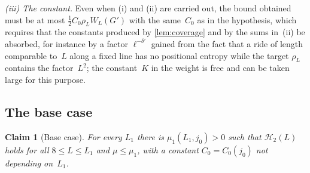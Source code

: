 \documentclass[11pt,letterpaper]{article}
\newtheorem{claim}{Claim}
\newenvironment{boxedclaim}[2]{\renewcommand{\theclaim}{#1}\begin{framed}\begin{claim}[#2]}{\end{claim}\end{framed}}
\begin{document}
\emph{(iii) The constant.} Even when (i) and (ii) are carried out, the bound obtained must be at most $\tfrac12C_0\rho_LW_L(G')$ with the same~$C_0$ as in the hypothesis, which requires that the constants produced by \cref{lem:coverage} and by the sums in~(ii) be absorbed, for instance by a factor $\ell^{-\delta'}$ gained from the fact that a ride of length comparable to~$L$ along a fixed line has no positional entropy while the target $\rho_L$ contains the factor~$L^2$; the constant~$K$ in the weight is free and can be taken large for this purpose.

\subsection{The base case}

\begin{boxedclaim}{C3}{Base case}
\label{claim:C3}
For every $L_1$ there is $\mu_1(L_1,j_0)>0$ such that $\mathcal H_2(L)$ holds for all $8\le L\le L_1$ and $\mu\le\mu_1$, with a constant $C_0=C_0(j_0)$ not depending on~$L_1$.
\end{boxedclaim}
\end{document}
